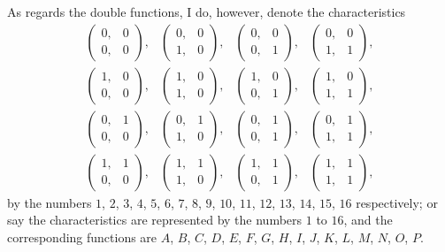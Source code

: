 \documentclass[11pt,a4paper]{book}
\begin{document}
As regards the double functions, I do, however, denote the characteristics
\[
\begin{matrix}
\begin{pmatrix} 0, & 0 \\ 0, & 0 \end{pmatrix}, &
\begin{pmatrix} 0, & 0 \\ 1, & 0 \end{pmatrix}, &
\begin{pmatrix} 0, & 0 \\ 0, & 1 \end{pmatrix}, &
\begin{pmatrix} 0, & 0 \\ 1, & 1 \end{pmatrix}, \\[1em]
\begin{pmatrix} 1, & 0 \\ 0, & 0 \end{pmatrix}, &
\begin{pmatrix} 1, & 0 \\ 1, & 0 \end{pmatrix}, &
\begin{pmatrix} 1, & 0 \\ 0, & 1 \end{pmatrix}, &
\begin{pmatrix} 1, & 0 \\ 1, & 1 \end{pmatrix}, \\[1em]
\begin{pmatrix} 0, & 1 \\ 0, & 0 \end{pmatrix}, &
\begin{pmatrix} 0, & 1 \\ 1, & 0 \end{pmatrix}, &
\begin{pmatrix} 0, & 1 \\ 0, & 1 \end{pmatrix}, &
\begin{pmatrix} 0, & 1 \\ 1, & 1 \end{pmatrix}, \\[1em]
\begin{pmatrix} 1, & 1 \\ 0, & 0 \end{pmatrix}, &
\begin{pmatrix} 1, & 1 \\ 1, & 0 \end{pmatrix}, &
\begin{pmatrix} 1, & 1 \\ 0, & 1 \end{pmatrix}, &
\begin{pmatrix} 1, & 1 \\ 1, & 1 \end{pmatrix},
\end{matrix}
\]
by the numbers $1$, $2$, $3$, $4$, $5$, $6$, $7$, $8$, $9$, $10$, $11$, $12$, $13$, $14$, $15$, $16$ respectively; or say the characteristics are represented by the numbers $1$ to $16$, and the corresponding functions are $A$, $B$, $C$, $D$, $E$, $F$, $G$, $H$, $I$, $J$, $K$, $L$, $M$, $N$, $O$, $P$.
\end{document}
